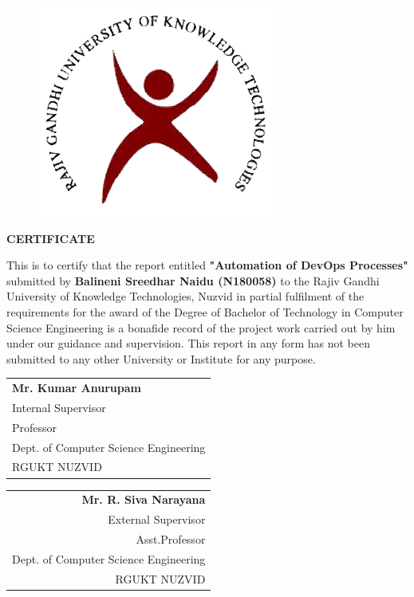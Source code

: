 \documentclass[12pt,a4paper,oneside]{report}
\begin{document}
\begin{figure}[hbt]
\centering
\centerline{\includegraphics[scale=0.25]{images/rgukt.png}}
\end{figure}

\begin{center} 
{\Large  \textbf{CERTIFICATE}}\end{center}
\begin{spacing}{1.5}
This is to certify that the report entitled \textbf{"Automation of DevOps Processes"} submitted by \textbf{Balineni Sreedhar Naidu (N180058)} to the Rajiv Gandhi University of Knowledge Technologies, Nuzvid in partial fulfilment of the requirements for the award of the Degree of Bachelor of Technology in Computer Science Engineering is a bonafide record of the project work carried out by him under our guidance and supervision. This report in any form has not been submitted to any other University or Institute for any purpose.\end{spacing}
\vspace{2cm}
\noindent
\begin{tabular}[t]{@{}l}
\textbf{Mr. Kumar Anurupam }\\ Internal Supervisor\\Professor\\Dept. of Computer Science Engineering \\RGUKT NUZVID
\end{tabular}
\hfill
\begin{tabular}[t]{@{}r}
\textbf{Mr. R. Siva Narayana}\\External Supervisor\\Asst.Professor\\Dept. of Computer Science Engineering\\RGUKT NUZVID
\end{tabular}
\end{document}
